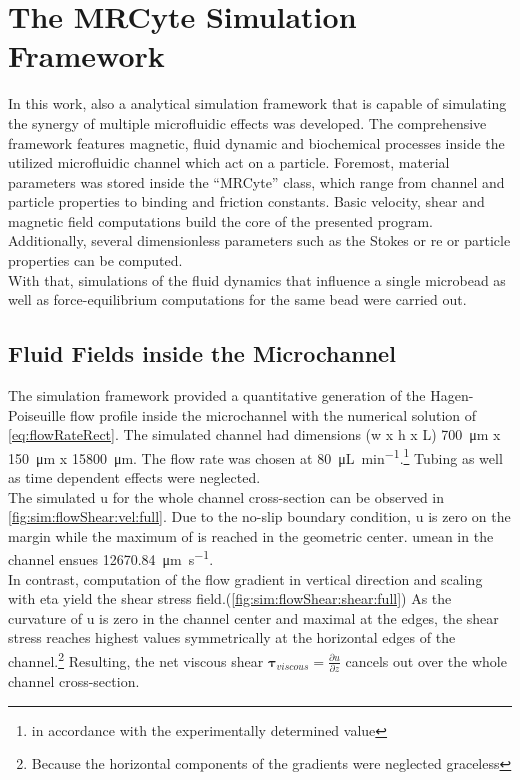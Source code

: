 \section{The MRCyte Simulation Framework}
In this work, also a analytical simulation framework that is capable of simulating the synergy of multiple microfluidic effects was developed. The comprehensive framework features magnetic, fluid dynamic and biochemical processes inside the utilized microfluidic channel which act on a particle. Foremost, material parameters was stored inside the ``MRCyte'' class, which range from channel and particle properties to binding and friction constants. Basic velocity, shear and magnetic field computations build the core of the presented program. Additionally, several dimensionless parameters such as the Stokes or \gls{re} or particle properties can be computed.\\
With that, simulations of the fluid dynamics that influence a single microbead as well as force-equilibrium computations for the same bead were carried out. 


\subsection{Fluid Fields inside the Microchannel}
The simulation framework provided a quantitative generation of the Hagen-Poiseuille flow profile inside the microchannel with the numerical solution of \cref{eq:flowRateRect}. The simulated channel had dimensions (w x h x L) \SI{700}{\micro\meter} x \SI{150}{\micro\meter} x \SI{15800}{\micro\meter}. The flow rate was chosen at \SI{80}{\micro\liter\per\minute}.\footnote{in accordance with the experimentally determined value} Tubing as well as time dependent effects were neglected. \\
The simulated \acrfull{u} for the whole channel cross-section can be observed in \cref{fig:sim:flowShear:vel:full}. Due to the no-slip boundary condition, \gls{u} is zero on the margin while the maximum of is reached in the geometric center. \gls{umean} in the channel ensues \SI{12670.84}{\micro\meter\per\second}. \\
In contrast, computation of the flow gradient in vertical direction and scaling with \gls{eta} yield the shear stress field.(\cref{fig:sim:flowShear:shear:full}) As the curvature of \gls{u} is zero in the channel center and maximal at the edges, the shear stress reaches highest values symmetrically at the horizontal edges of the channel.\footnote{Because the horizontal components of the gradients were neglected graceless} Resulting, the net viscous shear $\boldsymbol{\tau}_{viscous} = \frac{\partial u}{\partial z}$ cancels out over the whole channel cross-section.


